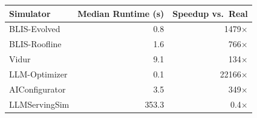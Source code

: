\begin{tabular}{lrr}
\toprule
Simulator & Median Runtime (s) & Speedup vs.\ Real \\
\midrule
BLIS-Evolved & 0.8 & 1479$\times$ \\
BLIS-Roofline & 1.6 & 766$\times$ \\
Vidur & 9.1 & 134$\times$ \\
LLM-Optimizer & 0.1 & 22166$\times$ \\
AIConfigurator & 3.5 & 349$\times$ \\
LLMServingSim & 353.3 & 0.4$\times$ \\
\bottomrule
\end{tabular}